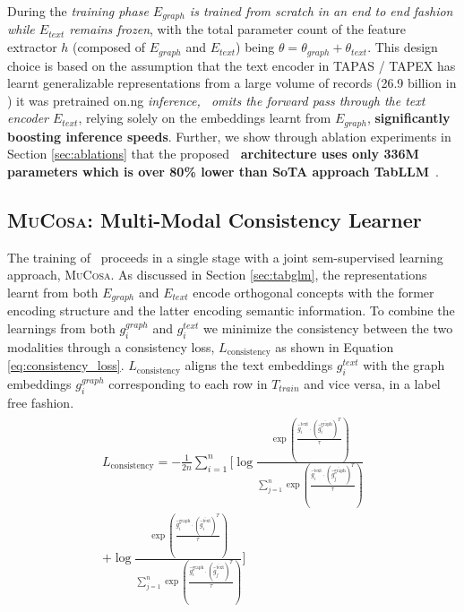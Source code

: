 During the \textit{training phase $E_{graph}$ is trained from scratch in an end to end fashion while $E_{text}$ remains frozen}, with the total parameter count of the feature extractor $h$ (composed of $E_{graph}$ and $E_{text}$) being $\theta = \theta_{graph} + \theta_{text}$. This design choice is based on the assumption that the text encoder in TAPAS / TAPEX has learnt generalizable representations from a large volume of records (26.9 billion in \citet{tapas})  it was pretrained on.ng \textit{inference, \tabglm\ omits the forward pass through the text encoder $E_{text}$}, relying solely on the embeddings learnt from $E_{graph}$, \textbf{significantly boosting inference speeds}.
Further, we show through ablation experiments in Section \ref{sec:ablations} that the proposed \textbf{\tabglm\ architecture uses only 336M parameters which is over 80\% lower than SoTA approach TabLLM}~\cite{tabllm}.

\subsection{\textsc{MuCosa}: \textbf{Mu}lti-Modal \textbf{Co}n\textbf{s}istency Le\textbf{a}rner}
\label{sec:joint_learner}
The training of \tabglm\ proceeds in a single stage with a joint sem-supervised learning approach, \textsc{MuCosa}.
As discussed in Section \ref{sec:tabglm}, the representations learnt from both $E_{graph}$ and $E_{text}$ encode orthogonal concepts with the former encoding structure and the latter encoding semantic information.
To combine the learnings from both $g_i^{graph}$ and $g_i^{text}$ we minimize the consistency between the two modalities through a consistency loss, $L_{\text{consistency}}$ as shown in Equation \ref{eq:consistency_loss}. $L_{\text{consistency}}$ aligns the text embeddings $g_i^{text}$ with the graph embeddings $g_i^{graph}$ corresponding to each row in $T_{train}$ and vice versa, in a label free fashion.
\begin{align}
\begin{split}
L_{\text{consistency}} = -\frac{1}{2n} \sum_{i=1}^{n} \Biggl[ \log \frac{\exp\left(\frac{\hat{g}_i^{\text{text}} \cdot (\overline{\hat{g}_i^{\text{graph}}})^T}{\tau}\right)}{\sum_{j=1}^{n} \exp\left(\frac{\hat{g}_i^{\text{text}} \cdot (\overline{\hat{g}_j^{\text{graph}}})^T}{\tau}\right)} \\
+ \log \frac{\exp\left(\frac{\hat{g}_i^{\text{graph}} \cdot (\overline{\hat{g}_i^{\text{text}}})^T}{\tau}\right)}{\sum_{j=1}^{n} \exp\left(\frac{\hat{g}_i^{\text{graph}} \cdot (\overline{\hat{g}_j^{\text{text}}})^T}{\tau}\right)} \Biggr] \\
\end{split}
\label{eq:consistency_loss}
\end{align}

